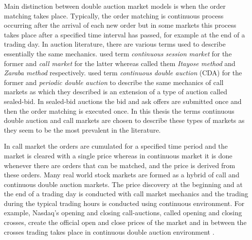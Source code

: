 Main distinction between double auction market models is when
the order matching takes place. Typically, the order matching 
is continuous process occurring after the arrival of each new order but
in some markets this process takes place after a specified time interval
has passed, for example at the end of a trading day. \citep{boer05}
In auction literature, there are various terms used to describe essentially 
the same mechanics. \citet{boer05} used term 
\textit{continuous session market} for the former and \textit{call market}
for the latter whereas \citet{ASt05} called them \textit{Itayose method}
and \textit{Zaraba method} respectively. \citet{Moc15} used term \textit{continuous 
double auction} (CDA) for the former and \textit{periodic double auction} to describe 
the same mechanics of call markets as which they described is an extension of 
a type of auction called sealed-bid. In sealed-bid auctions the bid and ask offers
are submitted once and then the order matching is executed once. In this thesis
the terms continuous double auction and call markets are chosen to describe
these types of markets as they seem to be the most prevalent in the literature.

In call market the orders are cumulated for a specified time period and the
market is cleared with a single price whereas in continuous market it is done
whenever there are orders that can be matched, and the price is derived from these
orders. \citep{boer05} 
Many real world stock markets are formed as a hybrid of call and continuous
double auction markets. The price discovery at the beginning and at the end of a 
trading day is conducted with call market mechanics and the trading during the 
typical trading hours is conducted using continuous environment. \citep{NasdaqClosing05}
For example, Nasdaq's opening and closing call-auctions, called opening and closing crosses,
create the official open and close prices of the market and in between the crosses 
trading takes place in continuous double auction environment \citep{NasdaqCrosses}.  
 
